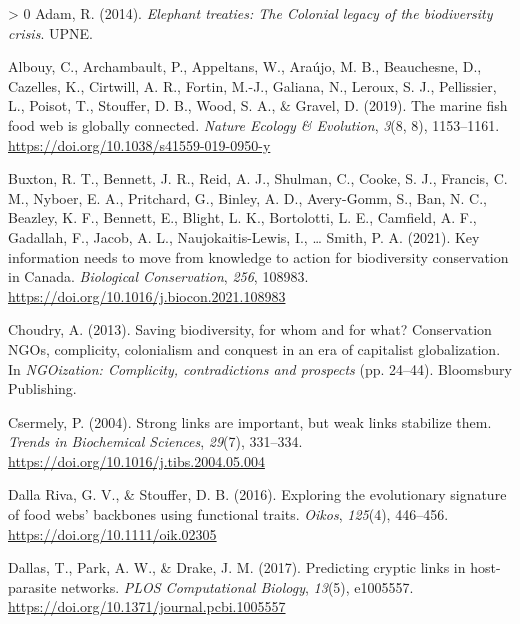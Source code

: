 \documentclass[11pt]{article}
\newlength{\cslhangindent}
\newenvironment{CSLReferences}[3] %
 {%
  \setlength{\parindent}{0pt}
  \ifodd #1 \everypar{\setlength{\hangindent}{\cslhangindent}}\ignorespaces\fi
  \ifnum #2 > 0
  \setlength{\parskip}{#2\baselineskip}
  \fi
 }%
 {}
\begin{document}
\hypertarget{refs}{}
\begin{CSLReferences}{1}{0}
\leavevmode\hypertarget{ref-Adam2014EleTre}{}%
Adam, R. (2014). \emph{Elephant treaties: The Colonial legacy of the
biodiversity crisis}. UPNE.

\leavevmode\hypertarget{ref-Albouy2019MarFis}{}%
Albouy, C., Archambault, P., Appeltans, W., Araújo, M. B., Beauchesne,
D., Cazelles, K., Cirtwill, A. R., Fortin, M.-J., Galiana, N., Leroux,
S. J., Pellissier, L., Poisot, T., Stouffer, D. B., Wood, S. A., \&
Gravel, D. (2019). The marine fish food web is globally connected.
\emph{Nature Ecology \& Evolution}, \emph{3}(8, 8), 1153--1161.
\url{https://doi.org/10.1038/s41559-019-0950-y}

\leavevmode\hypertarget{ref-Buxton2021KeyInf}{}%
Buxton, R. T., Bennett, J. R., Reid, A. J., Shulman, C., Cooke, S. J.,
Francis, C. M., Nyboer, E. A., Pritchard, G., Binley, A. D., Avery-Gomm,
S., Ban, N. C., Beazley, K. F., Bennett, E., Blight, L. K., Bortolotti,
L. E., Camfield, A. F., Gadallah, F., Jacob, A. L., Naujokaitis-Lewis,
I., \ldots{} Smith, P. A. (2021). Key information needs to move from
knowledge to action for biodiversity conservation in Canada.
\emph{Biological Conservation}, \emph{256}, 108983.
\url{https://doi.org/10.1016/j.biocon.2021.108983}

\leavevmode\hypertarget{ref-Choudry2013SavBio}{}%
Choudry, A. (2013). Saving biodiversity, for whom and for what?
Conservation NGOs, complicity, colonialism and conquest in an era of
capitalist globalization. In \emph{NGOization: Complicity,
contradictions and prospects} (pp. 24--44). Bloomsbury Publishing.

\leavevmode\hypertarget{ref-Csermely2004StrLin}{}%
Csermely, P. (2004). Strong links are important, but weak links
stabilize them. \emph{Trends in Biochemical Sciences}, \emph{29}(7),
331--334. \url{https://doi.org/10.1016/j.tibs.2004.05.004}

\leavevmode\hypertarget{ref-DallaRiva2016ExpEvo}{}%
Dalla Riva, G. V., \& Stouffer, D. B. (2016). Exploring the evolutionary
signature of food webs' backbones using functional traits. \emph{Oikos},
\emph{125}(4), 446--456. \url{https://doi.org/10.1111/oik.02305}

\leavevmode\hypertarget{ref-Dallas2017PreCry}{}%
Dallas, T., Park, A. W., \& Drake, J. M. (2017). Predicting cryptic
links in host-parasite networks. \emph{PLOS Computational Biology},
\emph{13}(5), e1005557.
\url{https://doi.org/10.1371/journal.pcbi.1005557}


\end{CSLReferences}
\end{document}
